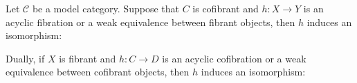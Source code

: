\documentclass[../thesis.tex]{subfiles}
\begin{document}
            \begin{lemma}\label{lem: Weird-Whitehead}
                Let $\mathcal{C}$ be a model category. Suppose that $C$ is cofibrant and $h: X \rightarrow Y$ is an acyclic fibration or a weak equivalence between fibrant objects, then $h$ induces an isomorphism:
                \begin{center}
                \end{center}

                Dually, if $X$ is fibrant and $h: C \rightarrow D$ is an acyclic cofibration or a weak equivalence between cofibrant objects, then $h$ induces an isomorphism:
                \begin{center}
                \end{center}
            \end{lemma}
\end{document}
